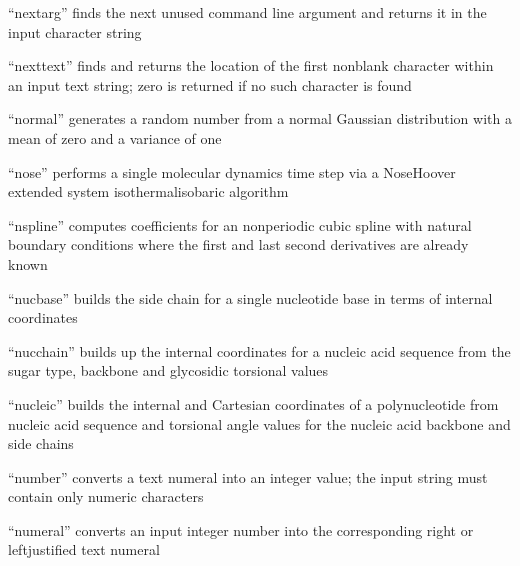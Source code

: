 \documentclass[letterpaper,11pt,english]{sphinxmanual}
\begin{document}
\sphinxAtStartPar
“nextarg” finds the next unused command line argument and returns it in the input character string

\sphinxAtStartPar
{}

\sphinxAtStartPar
“nexttext” finds and returns the location of the first non\sphinxhyphen{}blank character within an input text string; zero is returned if no such character is found

\sphinxAtStartPar
{}

\sphinxAtStartPar
“normal” generates a random number from a normal Gaussian distribution with a mean of zero and a variance of one

\sphinxAtStartPar
{}

\sphinxAtStartPar
“nose” performs a single molecular dynamics time step via a Nose\sphinxhyphen{}Hoover extended system isothermal\sphinxhyphen{}isobaric algorithm

\sphinxAtStartPar
{}

\sphinxAtStartPar
“nspline” computes coefficients for an nonperiodic cubic spline with natural boundary conditions where the first and last second derivatives are already known

\sphinxAtStartPar
{}

\sphinxAtStartPar
“nucbase” builds the side chain for a single nucleotide base in terms of internal coordinates

\sphinxAtStartPar
{}

\sphinxAtStartPar
“nucchain” builds up the internal coordinates for a nucleic acid sequence from the sugar type, backbone and glycosidic torsional values

\sphinxAtStartPar
{}

\sphinxAtStartPar
“nucleic” builds the internal and Cartesian coordinates of a polynucleotide from nucleic acid sequence and torsional angle values for the nucleic acid backbone and side chains

\sphinxAtStartPar
{}

\sphinxAtStartPar
“number” converts a text numeral into an integer value; the input string must contain only numeric characters

\sphinxAtStartPar
{}

\sphinxAtStartPar
“numeral” converts an input integer number into the corresponding right\sphinxhyphen{} or left\sphinxhyphen{}justified text numeral
\end{document}
